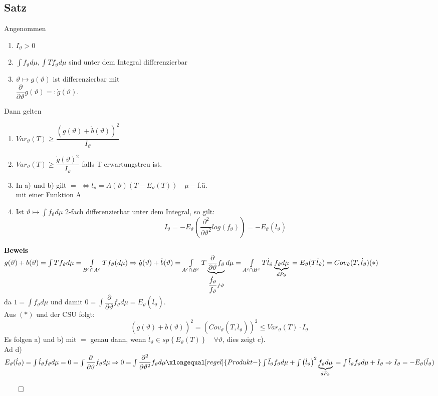 \documentclass[german,10pt,oneside, fleqn, a4paper]{article}
\newcommand{\Ra}	{\Rightarrow}
\newcommand{\LRa}{\Leftrightarrow}
\newcommand{\brc}[1]{\left(#1\right)}
\newcommand{\brac}[1]{\left\lbrace #1\right\rbrace}
\newcommand{\QED}{\begin{flushright}$\qed$\end{flushright}}
\newcommand{\beweis}{\textbf{Beweis}\\}
\newcommand{\1}[1]{1_{#1}}
\newcommand{\2}[1]{\1{\brac{#1}}}
\newcommand{\qf}{\quad\forall}
\begin{document}
\subsection{Satz}
\label{13.3}
Angenommen \begin{enumerate}[label=(\roman*)]
\item $I_\vartheta>0$
\item $\int f_\vartheta d\mu, \int Tf_\vartheta d\mu$ sind unter dem Integral differenzierbar
\item $\vartheta\mapsto g(\vartheta)$ ist differenzierbar mit \\
$\dfrac{\partial}{\partial\vartheta}g(\vartheta)=:\dot g(\vartheta).$
\end{enumerate}
Dann gelten\begin{enumerate}[label=(\alph*)]
\item $Var_\vartheta(T)\geq\dfrac{(\dot g(\vartheta)+\dot b(\vartheta))^2}{I_\vartheta}$
\item $Var_\vartheta(T)\geq \dfrac{\dot g(\vartheta)^2}{I_\vartheta}$ falls T erwartungstreu ist.
\item In a) und b) gilt \glqq $=$ \grqq$\LRa \dot l_\vartheta=A(\vartheta)(T-E_\vartheta(T))\quad\mu-$f.ü. \\mit einer Funktion A
\item Ist $\vartheta\mapsto\int f_\vartheta d\mu$ 2-fach differenzierbar unter dem Integral, so gilt:\[
I_\vartheta=-E_\vartheta\brc{\dfrac{\partial^2}{\partial\vartheta^2}log(f_\vartheta)}=-E_\vartheta(\ddot l_\vartheta)\]
\end{enumerate}
\beweis
$g(\vartheta)+b(\vartheta)=\int Tf_\vartheta d\mu=\int\limits_{B^c\cap A^c}Tf_\vartheta(d\mu)\\
\Ra \dot{g}(\vartheta)+\dot b(\vartheta)=\int\limits_{A^c\cap B^c}T\underbrace{\dfrac{\partial}{\partial\vartheta}f_\vartheta}_{\dfrac{\dot f_\vartheta}{f_\vartheta}f\vartheta}d\mu=\int\limits_{A^c\cap B^c} T\dot l_\vartheta \underbrace{f_\vartheta d\mu}_{dP_\vartheta}\\
=E_\vartheta(T\dot l_\vartheta)=Cov_\vartheta(T,\dot l_\vartheta)\hfill (*)$\\
da $1=\int f_\vartheta d\mu$ und damit $0=\int\dfrac{\partial}{\partial\vartheta}f_\vartheta d\mu=E_\vartheta(\dot l_\vartheta)$.\\
Aus $(*)$ und der CSU folgt:\[
\brc{\dot g(\vartheta)+\dot b(\vartheta)}^2=\brc{Cov_\vartheta(T,\dot l_\vartheta)}^2\leq Var_\vartheta(T)\cdot I_\vartheta\]
Es folgen a) und b) mit \glqq $=$ \grqq genau dann, wenn $\dot l_\vartheta\in sp\brac{E_\vartheta(T)}\qf \vartheta$, dies zeigt c).\\
Ad d)\\
$E_\vartheta(\dot l_\vartheta)=\int \dot l_\vartheta f_\vartheta d\mu=0=\int\dfrac{\partial}{\partial\vartheta}f_\vartheta d\mu\\
\Ra 0=\int\dfrac{\partial^2}{\partial\vartheta^2}f_\vartheta d\mu\xlongequal[regel]{Produkt-}\int\ddot l_\vartheta f_\vartheta d\mu+\int \brc{\dot l_\vartheta}^2\underbrace{f_\vartheta d\mu}_{dP_\vartheta}\\
=\int\ddot l_\vartheta f_\vartheta d\mu+I_\vartheta\\
\Ra I_\vartheta=-E_\vartheta(\ddot l_\vartheta)$\QED
\end{document}
